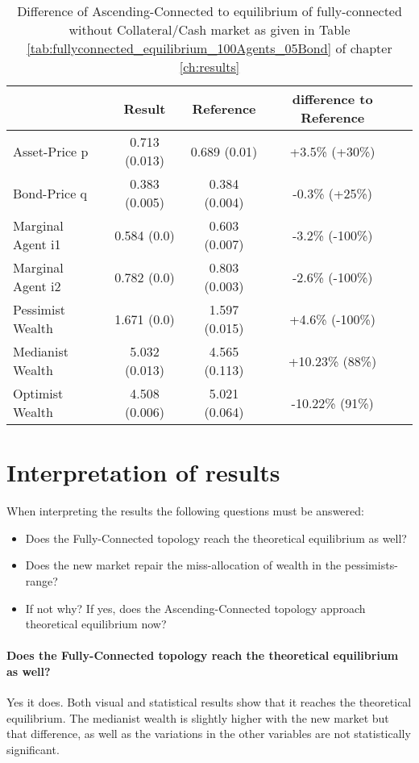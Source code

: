 \documentclass[Bachelorarbeit.tex]{subfiles}
\begin{document}
\begin{table}[H]
	\caption{Difference of Ascending-Connected to equilibrium of fully-connected without Collateral/Cash market as given in Table \ref{tab:fullyconnected_equilibrium_100Agents_05Bond} of chapter \ref{ch:results}}
	\centering
	\begin{tabular} { l c c c r }
		& Result & Reference & difference to Reference \\
		\hline
		Asset-Price p & 0.713 (0.013) & 0.689 (0.01) & +3.5\% (+30\%) \\
		Bond-Price q & 0.383 (0.005) & 0.384 (0.004) & -0.3\% (+25\%) \\
		Marginal Agent i1 & 0.584 (0.0) & 0.603 (0.007) & -3.2\% (-100\%) \\
		Marginal Agent i2 & 0.782 (0.0) & 0.803 (0.003) & -2.6\% (-100\%) \\
		\hline
		Pessimist Wealth & 1.671 (0.0) & 1.597 (0.015) & +4.6\% (-100\%) \\
		Medianist Wealth & 5.032 (0.013) & 4.565 (0.113) & +10.23\% (88\%) \\
		Optimist Wealth & 4.508 (0.006) & 5.021 (0.064) & -10.22\% (91\%) \\
		\hline
	\end{tabular}
\end{table} 

\section{Interpretation of results}
When interpreting the results the following questions must be answered:

\begin{itemize}
\item Does the Fully-Connected topology reach the theoretical equilibrium as well?
\item Does the new market repair the miss-allocation of wealth in the pessimists-range?
\item If not why? If yes, does the Ascending-Connected topology approach theoretical equilibrium now?
\end{itemize}

\paragraph{Does the Fully-Connected topology reach the theoretical equilibrium as well?}
Yes it does. Both visual and statistical results show that it reaches the theoretical equilibrium. The medianist wealth is slightly higher with the new market but that difference, as well as the variations in the other variables are not statistically significant.
\end{document}
